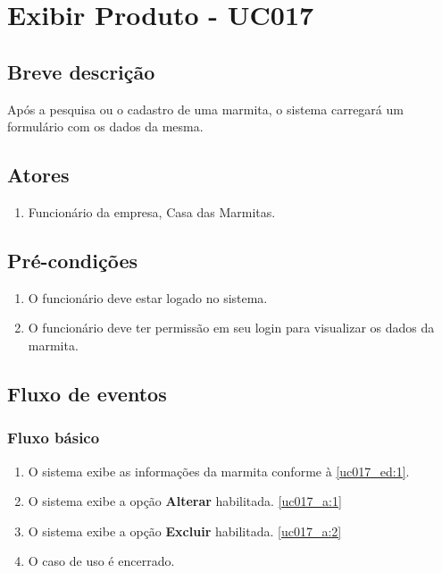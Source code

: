\chapter{Exibir Produto - UC017} \label{uc017}

\section{Breve descrição}

Após a pesquisa ou o cadastro de uma marmita, o sistema carregará um formulário com os dados da mesma.

\section{Atores}

\begin{enumerate}
	\item Funcionário da empresa, Casa das Marmitas.
\end{enumerate}

\section{Pré-condições}

\begin{enumerate}
	\item O funcionário deve estar logado no sistema.
	\item O funcionário deve ter permissão em seu login para visualizar os dados da marmita.
\end{enumerate}

\section{Fluxo de eventos}

\subsection{Fluxo básico}

\begin{enumerate}[label=P\arabic*]
	\item O sistema exibe as informações da marmita conforme à \ref{uc017_ed:1}. \label{uc017_p:1}
	\item O sistema exibe a opção \textbf{Alterar} habilitada.\label{uc017_p:2} \ref{uc017_a:1} 
	\item O sistema exibe a opção \textbf{Excluir} habilitada.\label{uc017_p:3} \ref{uc017_a:2}
	\item O caso de uso é encerrado.
\end{enumerate}

